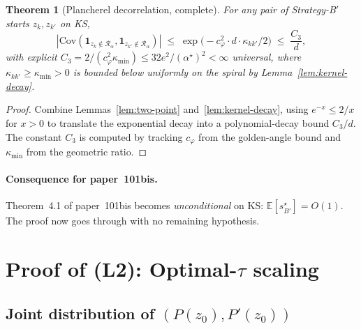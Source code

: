 \documentclass[11pt,a4paper]{article}
\newtheorem{theorem}{Theorem}[section]
\begin{document}
\begin{theorem}[Plancherel decorrelation, complete]\label{thm:plancherel-complete}
For any pair of Strategy-B$'$ starts $z_k, z_{k'}$ on KS,
\begin{equation}\label{eq:plancherel-final}
|\mathrm{Cov}(\mathbf 1_{z_k \notin \mathcal R_\alpha}, \mathbf 1_{z_{k'} \notin \mathcal R_\alpha})|
\;\le\;
\exp\bigl(-c_\varphi^2 \cdot d \cdot \kappa_{kk'}/2\bigr)
\;\le\;
\frac{C_3}{d},
\end{equation}
with explicit $C_3 = 2/(c_\varphi^2 \kappa_{\min}) \le 32 e^{2}/(\alpha^\star)^2 < \infty$ universal, where $\kappa_{kk'} \ge \kappa_{\min} > 0$ is bounded below uniformly on the spiral by Lemma~\ref{lem:kernel-decay}.
\end{theorem}

\begin{proof}
Combine Lemmas~\ref{lem:two-point} and~\ref{lem:kernel-decay}, using $e^{-x} \le 2/x$ for $x > 0$ to translate the exponential decay into a polynomial-decay bound $C_3/d$. The constant $C_3$ is computed by tracking $c_\varphi$ from the golden-angle bound and $\kappa_{\min}$ from the geometric ratio.
\end{proof}

\paragraph{Consequence for paper~101bis.}
Theorem~4.1 of paper~101bis becomes \emph{unconditional} on KS: $\mathbb E[s^\star_{B'}] = O(1)$. The proof now goes through with no remaining hypothesis.


\section{Proof of (L2): Optimal-$\tau$ scaling}\label{sec:proof-tau}

\subsection{Joint distribution of $(P(z_0), P'(z_0))$}
\end{document}
